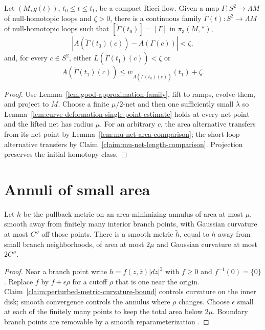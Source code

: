\begin{proposition}
\label{prop:curve-deformation-existence}
\label{XI}
Let $(M,g(t))$, $t_0\le t\le t_1$, be a compact Ricci flow. Given a map
$\Gamma\colon S^2\to\Lambda M$ of null-homotopic loops and $\zeta>0$, there
is a continuous family
$\widetilde\Gamma(t)\colon S^2\to\Lambda M$ of null-homotopic loops such that
$[\widetilde\Gamma(t_0)]=[\Gamma]$ in $\pi_3(M,*)$,
\[
|A(\widetilde\Gamma(t_0)(c))-A(\Gamma(c))|<\zeta,
\]
and, for every $c\in S^2$, either
$L(\widetilde\Gamma(t_1)(c))<\zeta$ or
\[
A(\widetilde\Gamma(t_1)(c))
\le w_{A(\widetilde\Gamma(t_0)(c))}(t_1)+\zeta.
\]
\end{proposition}
\begin{proof}
\sketch Use Lemma~\ref{lem:good-approximation-family}, lift to ramps, evolve them, and
project to $M$. Choose a finite $\mu/2$-net and then one sufficiently small
$\lambda$ so Lemma~\ref{lem:curve-deformation-single-point-estimate} holds at
every net point and the lifted net has radius $\mu$. For an arbitrary $c$, the
area alternative transfers from its net point by
Lemma~\ref{lem:mu-net-area-comparison}; the short-loop alternative transfers by
Claim~\ref{claim:mu-net-length-comparison}. Projection preserves the initial
homotopy class.
\end{proof}

\section{Annuli of small area}
\label{18.5}

\begin{claim}
\label{claim:branch-point-metric-deformation}
Let $h$ be the pullback metric on an area-minimizing annulus of area at most
$\mu$, smooth away from finitely many interior branch points, with Gaussian
curvature at most $C''$ off those points. There is a smooth metric
$\widetilde h$, equal to $h$ away from small branch neighborhoods, of area at
most $2\mu$ and Gaussian curvature at most $2C''$.
\end{claim}
\begin{proof}
\sketch Near a branch point write $h=f(z,\bar z)|dz|^2$ with $f\ge0$ and
$f^{-1}(0)=\{0\}$. Replace $f$ by $f+\epsilon\rho$ for a cutoff $\rho$ that is
one near the origin. Claim~\ref{claim:perturbed-metric-curvature-bound} controls
curvature on the inner disk; smooth convergence controls the annulus where
$\rho$ changes. Choose $\epsilon$ small at each of the finitely many points to
keep the total area below $2\mu$. Boundary branch points are removable by a
smooth reparameterization \cite{White}.
\end{proof}

